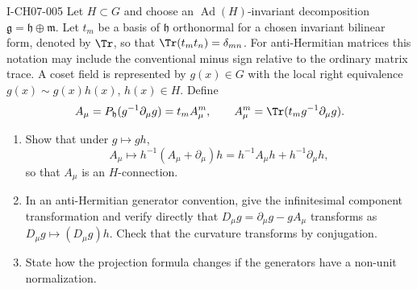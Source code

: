 \begin{exercise}{I-CH07-005}
Let $H\subset G$ and choose an $\operatorname{Ad}(H)$-invariant decomposition
$\mathfrak g=\mathfrak h\oplus\mathfrak m$.  Let $t_m$ be a basis of
$\mathfrak h$ orthonormal for a chosen invariant bilinear form, denoted by
$\Tr$, so that $\Tr(t_mt_n)=\delta_{mn}$.  For anti-Hermitian matrices this
notation may include the conventional minus sign relative to the ordinary
matrix trace.  A coset field is represented by $g(x)\in G$ with the local
right equivalence $g(x)\sim g(x)h(x)$, $h(x)\in H$.  Define
\[
 A_\mu=P_{\mathfrak h}(g^{-1}\partial_\mu g)
       =t_m A_\mu^m,
 \qquad
 A_\mu^m=\Tr(t_m g^{-1}\partial_\mu g).
\]
\begin{enumerate}[label=(\alph*)]
\item Show that under $g\mapsto gh$,
\[
 A_\mu\mapsto h^{-1}(A_\mu+\partial_\mu)h
 =h^{-1}A_\mu h+h^{-1}\partial_\mu h,
\]
so that $A_\mu$ is an $H$-connection.

\item In an anti-Hermitian generator convention, give the infinitesimal
component transformation and verify directly that
$D_\mu g=\partial_\mu g-gA_\mu$ transforms as
$D_\mu g\mapsto(D_\mu g)h$.  Check that the curvature transforms by
conjugation.

\item State how the projection formula changes if the generators have a
non-unit normalization.
\end{enumerate}
\end{exercise}
